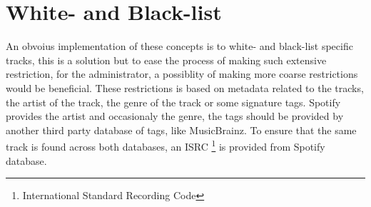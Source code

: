 \section{White- and Black-list}

An obvoius implementation of these concepts is to white- and black-list specific tracks, this is a solution but to ease the process of making such extensive restriction, for the administrator, a possiblity of making more coarse restrictions would be beneficial. These restrictions is based on metadata related to the tracks, the artist of the track, the genre of the track or some signature tags. Spotify provides the artist and occasionaly the genre, the tags should be provided by another third party database of tags, like MusicBrainz. To ensure that the same track is found across both databases, an ISRC \footnote{International Standard Recording Code\cite{isrc}} is provided from Spotify database.